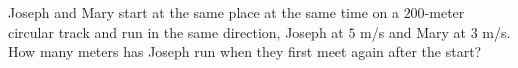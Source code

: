 Joseph and Mary start at the same place at the same time on a $200$-meter circular track and run in the same direction, Joseph at $5$ m/s and Mary at $3$ m/s. How many meters has Joseph run when they first meet again after the start?
